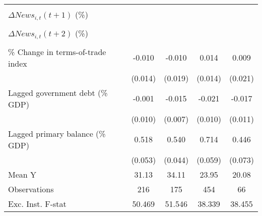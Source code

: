 {\begin{tabular}{l*{4}{c}}
                    &                     &                     &                     &                     \\
\addlinespace
$ \Delta News_{i,t}(t+1)$ (\%)&                     &                     &                     &                     \\
                    &                     &                     &                     &                     \\
\addlinespace
$ \Delta News_{i,t}(t+2)$ (\%)&                     &                     &                     &                     \\
                    &                     &                     &                     &                     \\
\addlinespace
\% Change in terms-of-trade index&      -0.010         &      -0.010         &       0.014         &       0.009         \\
                    &     (0.014)         &     (0.019)         &     (0.014)         &     (0.021)         \\
\addlinespace
Lagged government debt (\% GDP)&      -0.001         &      -0.015\sym{**} &      -0.021\sym{**} &      -0.017         \\
                    &     (0.010)         &     (0.007)         &     (0.010)         &     (0.011)         \\
\addlinespace
Lagged primary balance (\% GDP)&       0.518\sym{***}&       0.540\sym{***}&       0.714\sym{***}&       0.446\sym{***}\\
                    &     (0.053)         &     (0.044)         &     (0.059)         &     (0.073)         \\
\midrule
Mean Y              &       31.13         &       34.11         &       23.95         &       20.08         \\
Observations        &         216         &         175         &         454         &          66         \\
Exc. Inst. F-stat   &      50.469         &      51.546         &      38.339         &      38.455         \\
\bottomrule
\end{tabular}
}
